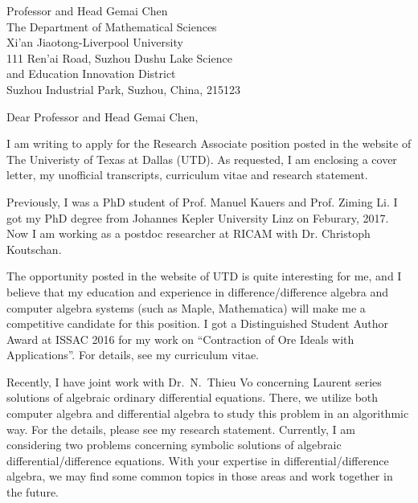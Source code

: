 \documentclass[11pt, a4paper]{letter} %
\begin{document}

\begin{letter}{
	Professor and Head Gemai Chen \\
	The Department of Mathematical Sciences\\
	Xi’an Jiaotong-Liverpool University\\
	111 Ren'ai Road, Suzhou Dushu Lake Science \\
	and Education Innovation District \\
	Suzhou Industrial Park, Suzhou, China, 215123
}


\opening{Dear Professor and Head Gemai Chen,}

I am writing to apply for the Research Associate position posted in the website of The Univeristy of Texas at Dallas (UTD). 
As requested, I am enclosing a cover letter, my unofficial transcripts, curriculum vitae and research statement. 

Previously, I was a PhD student of Prof. Manuel Kauers and Prof. Ziming Li. 
I got my PhD degree from Johannes Kepler University Linz on Feburary, 2017. 
Now I am working as a postdoc researcher at RICAM with Dr. Christoph Koutschan.

The opportunity posted in the website of UTD is quite interesting for me, 
and I believe that my education and experience in difference/difference algebra 
and computer algebra systems (such as Maple, Mathematica) will make me a competitive candidate for this position.
I got a Distinguished Student Author Award at ISSAC 2016 for my work on ``Contraction of Ore Ideals with Applications''. 
For details, see my curriculum vitae.

Recently, I have joint work with Dr.\ N.\ Thieu Vo concerning Laurent series solutions of algebraic ordinary differential equations. 
There, we utilize both computer algebra and differential algebra to study this problem in an algorithmic way. 
For the details, please see my research statement. 
Currently, I am considering two problems concerning symbolic solutions of algebraic differential/difference equations. 
With your expertise in differential/difference algebra, we may find some common topics in those areas and work together in the future. 


\end{letter}
\end{document}
